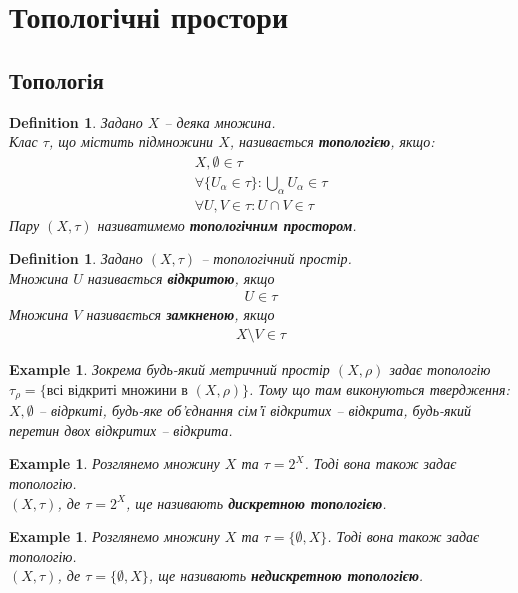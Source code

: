 \documentclass[a4paper, 10pt]{article}
\theoremstyle{theoremdd}
\newtheorem{definition}[theorem]{Definition}
\newtheorem{example}[theorem]{Example}
\begin{document}
\tableofcontents
\newpage

\section{Топологічні простори}
\subsection{Топологія}
\begin{definition}
Задано $X$ -- деяка множина.\\
Клас $\tau$, що містить підмножини $X$, називається \textbf{топологією}, якщо:
\begin{align*}
X, \emptyset \in \tau \\
\forall \{U_\alpha \in \tau\}: \bigcup_\alpha U_\alpha \in \tau \\
\forall U,V \in \tau: U \cap V \in \tau
\end{align*}
Пару $(X,\tau)$ називатимемо \textbf{топологічним простором}.
\end{definition}

\begin{definition}
Задано $(X,\tau)$ -- топологічний простір.\\
Множина $U$ називається \textbf{відкритою}, якщо
\begin{align*}
U \in \tau
\end{align*}
Множина $V$ називається \textbf{замкненою}, якщо
\begin{align*}
X \setminus V \in \tau
\end{align*}
\end{definition}

\begin{example}
Зокрема будь-який метричний простір $(X,\rho)$ задає топологію \\$\tau_\rho = \{ \text{всі відкриті множини в } (X,\rho)\}$. Тому що там виконуються твердження: $X, \emptyset$ -- відркиті, будь-яке об'єднання сім'ї відкритих -- відкрита, будь-який перетин двох відкритих -- відкрита.
\end{example}

\begin{example}
Розглянемо множину $X$ та $\tau = 2^X$. Тоді вона також задає топологію.\\
$(X,\tau)$, де $\tau = 2^X$, ще називають \textbf{дискретною топологією}.
\end{example}

\begin{example}
Розглянемо множину $X$ та $\tau = \{\emptyset, X\}$. Тоді вона також задає топологію.\\
$(X,\tau)$, де $\tau = \{\emptyset, X\}$, ще називають \textbf{недискретною топологією}.
\end{example}
\end{document}
